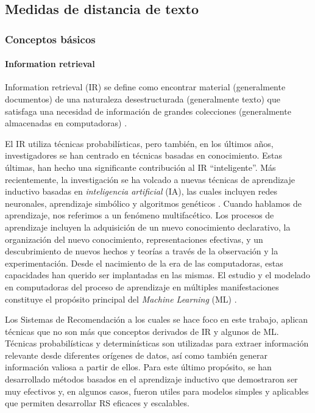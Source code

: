 \subsection{Medidas de distancia de texto}
\subsubsection{Conceptos básicos}
\paragraph{Information retrieval}
Information retrieval (IR) se define como encontrar material (generalmente documentos) de una naturaleza desestructurada (generalmente texto) que satisfaga una necesidad de información de grandes colecciones (generalmente almacenadas en computadoras) \citep{schutze2008introduction}.

\bigskip El IR utiliza técnicas probabilísticas, pero también, en los últimos años, investigadores se han centrado en técnicas basadas en conocimiento. Estas últimas, han hecho una significante contribución al IR “inteligente”. Más recientemente, la investigación se ha volcado a nuevas técnicas de aprendizaje inductivo basadas en \textit{inteligencia artificial} (IA), las cuales incluyen redes neuronales, aprendizaje simbólico y algoritmos genéticos \citep{chen1995machine}. Cuando hablamos de aprendizaje, nos referimos a un fenómeno multifacético. Los procesos de aprendizaje incluyen la adquisición de un nuevo conocimiento declarativo, la organización del nuevo conocimiento, representaciones efectivas, y un descubrimiento de nuevos hechos y teorías a través de la observación y la experimentación. Desde el nacimiento de la era de las computadoras, estas capacidades han querido ser implantadas en las mismas. El estudio y el modelado en computadoras del proceso de aprendizaje en múltiples manifestaciones constituye el propósito principal del \textit{Machine Learning} (ML) \citep{mitchell2013artificial}.

\bigskip Los Sistemas de Recomendación a los cuales se hace foco en este trabajo, aplican técnicas que no son más que conceptos derivados de IR y algunos de ML. Técnicas probabilísticas y determinísticas son utilizadas para extraer información relevante desde diferentes orígenes de datos, así como también generar información valiosa a partir de ellos. Para este último propósito, se han desarrollado métodos basados en el aprendizaje inductivo que demostraron ser muy efectivos y, en algunos casos, fueron utiles para modelos simples y aplicables que permiten desarrollar RS eficaces y escalables.

